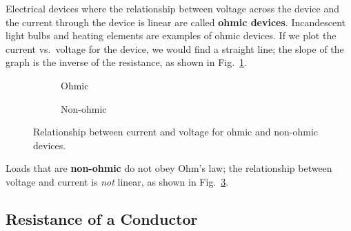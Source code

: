 Electrical devices where the relationship between voltage across the device and
the current through the device is linear are called \textbf{ohmic devices}.
Incandescent light bulbs and heating elements are examples of ohmic devices.
If we plot the current vs.\ voltage for the device, we would find a straight
line; the slope of the graph is the inverse of the resistance, as shown in
Fig.~\ref{fig:ohmic-relationship}.
\begin{figure}[ht]
  \centering
  \begin{subfigure}{.3\textwidth}
    \centering
    \caption{Ohmic}
    \label{fig:ohmic-relationship}
  \end{subfigure}
  \begin{subfigure}{.3\textwidth}
    \centering
    \caption{Non-ohmic}
    \label{fig:non-ohmic-relationship}
  \end{subfigure}
  \caption{Relationship between current and voltage for ohmic and non-ohmic
    devices.}
\end{figure}
Loads that are \textbf{non-ohmic} do not obey Ohm's law; the relationship
between voltage and current is \emph{not} linear, as shown in
Fig.~\ref{fig:non-ohmic-relationship}.



\subsection{Resistance of a Conductor}

